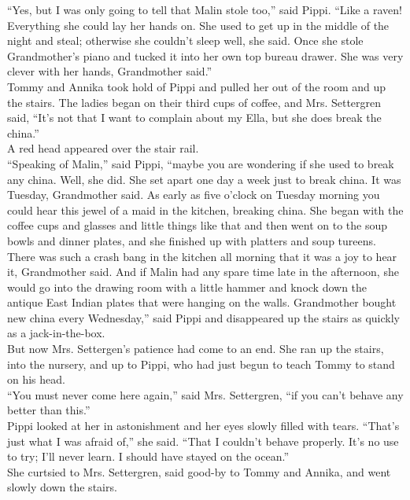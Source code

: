 \documentclass{standard}
\begin{document}
“Yes, but I was only going to tell that Malin stole too,” said Pippi. “Like a raven! Everything she could lay her hands on. She used to get up in the middle of the night and steal; otherwise she couldn’t sleep well, she said. Once she stole Grandmother’s piano and tucked it into her own top bureau drawer. She was very clever with her hands, Grandmother said.”\\

Tommy and Annika took hold of Pippi and pulled her out of the room and up the stairs. The ladies began on their third cups of coffee, and Mrs. Settergren said, “It’s not that I want to complain about my Ella, but she does break the china.”\\

A red head appeared over the stair rail.\\

“Speaking of Malin,” said Pippi, “maybe you are wondering if she used to break any china. Well, she did. She set apart one day a week just to break china. It was Tuesday, Grandmother said. As early as five o’clock on Tuesday morning you could hear this jewel of a maid in the kitchen, breaking china. She began with the coffee cups and glasses and little things like that and then went on to the soup bowls and dinner plates, and she finished up with platters and soup tureens. There was such a crash bang in the kitchen all morning that it was a joy to hear it, Grandmother said. And if Malin had any spare time late in the afternoon, she would go into the drawing room with a little hammer and knock down the antique East Indian plates that were hanging on the walls. Grandmother bought new china every Wednesday,” said Pippi and disappeared up the stairs as quickly as a jack-in-the-box.\\

But now Mrs. Settergen’s patience had come to an end. She ran up the stairs, into the nursery, and up to Pippi, who had just begun to teach Tommy to stand on his head.\\
“You must never come here again,” said Mrs. Settergren, “if you can’t behave any better than this.”\\

Pippi looked at her in astonishment and her eyes slowly filled with tears. “That’s just what I was afraid of,” she said. “That I couldn’t behave properly. It’s no use to try; I’ll never learn. I should have stayed on the ocean.”\\

She curtsied to Mrs. Settergren, said good-by to Tommy and Annika, and went slowly down the stairs.\\
\end{document}
